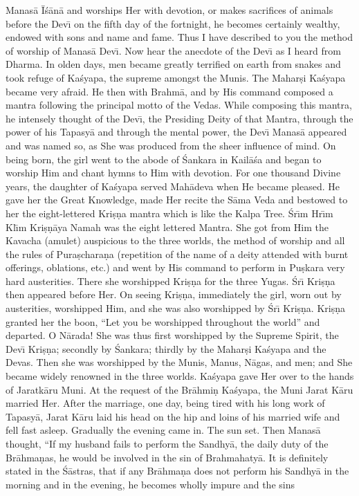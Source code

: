 Manas\=a \=I\'s\=an\=a and worships Her with devotion, or makes sacrifices of animals before the Dev\={\i} on the fifth day of the fortnight, he becomes certainly wealthy, endowed with sons and name and fame. Thus I have described to you the method of worship of Manas\=a Dev\={\i}. Now hear the anecdote of the Dev\={\i} as I heard from Dharma. In olden days, men became greatly terrified on earth from snakes and took refuge of Ka\'syapa, the supreme amongst the Munis. The Mahar\d{s}i Ka\'syapa became very afraid. He then with Brahm\=a, and by His command composed a mantra following the principal motto of the Vedas. While composing this mantra, he intensely thought of the Dev\={\i}, the Presiding Deity of that Mantra, through the power of his Tapasy\=a and through the mental power, the Dev\={\i} Manas\=a appeared and was named so, as She was produced from the sheer influence of mind. On being born, the girl went to the abode of \'Sankara in Kail\=a\'sa and began to worship Him and chant hymns to Him with devotion. For one thousand Divine years, the daughter of Ka\'syapa served Mah\=adeva when He became pleased. He gave her the Great Knowledge, made Her recite the S\=ama Veda and bestowed to her the eight-lettered Kri\d{s}\d{n}a mantra which is like the Kalpa Tree. \'Sr\={\i}m Hr\={\i}m Kl\={\i}m Kri\d{s}\d{n}\=aya Namah was the eight lettered Mantra. She got from Him the Kavacha (amulet) auspicious to the three worlds, the method of worship and all the rules of Pura\d{s}chara\d{n}a (repetition of the name of a deity attended with burnt offerings, oblations, etc.) and went by His command to perform in Pu\d{s}kara very hard austerities. There she worshipped Kri\d{s}\d{n}a for the three Yugas. \'Sr\={\i} Kri\d{s}\d{n}a then appeared before Her. On seeing Kri\d{s}\d{n}a, immediately the girl, worn out by austerities, worshipped Him, and she was also worshipped by \'Sr\={\i} Kri\d{s}\d{n}a. Kri\d{s}\d{n}a granted her the boon, ``Let you be worshipped throughout the world'' and departed. O N\=arada! She was thus first worshipped by the Supreme Spirit, the Dev\={\i} Kri\d{s}\d{n}a; secondly by \'Sankara; thirdly by the Mahar\d{s}i Ka\'syapa and the Devas. Then she was worshipped by the Munis, Manus, N\=agas, and men; and She became widely renowned in the three worlds. Ka\'syapa gave Her over to the hands of Jaratk\=aru Muni. At the request of the Br\=ahmi\d{n} Ka\'syapa, the Muni Jarat K\=aru married Her. After the marriage, one day, being tired with his long work of Tapasy\=a, Jarat K\=aru laid his head on the hip and loins of his married wife and fell fast asleep. Gradually the evening came in. The sun set. Then Manas\=a thought, ``If my husband fails to perform the Sandhy\=a, the daily duty of the Br\=ahma\d{n}as, he would be involved in the sin of Brahmahaty\=a. It is definitely stated in the \'S\=astras, that if any Br\=ahma\d{n}a does not perform his Sandhy\=a in the morning and in the evening, he becomes wholly impure and the sins


